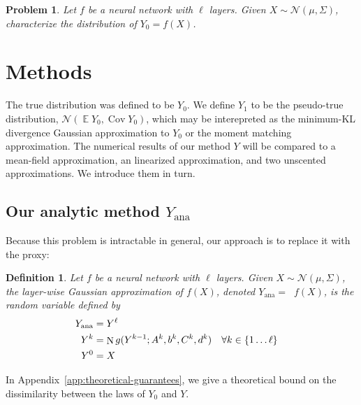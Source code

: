 \documentclass{article}
\newtheorem{definition}{Definition}
\newtheorem{problem}{Problem}
\DeclareMathOperator{\expect}{\mathbb{E}}
\DeclareMathOperator{\Cov}{\operatorname{Cov}}
\DeclareMathOperator{\normal}{\mathrm N}
\DeclareMathOperator{\Normal}{\mathrm N^*}
\begin{document}
\begin{problem}
    \label{prob:problem}
    Let \(f\) be a neural network with \(\ell\) layers.
    Given \(X \sim \mathcal N(\mu, \Sigma)\), characterize the distribution of \(Y_0 = f(X)\).
\end{problem}


\section{Methods}
The true distribution was defined to be \(Y_0\).
We define \(Y_1\) to be the pseudo-true distribution, \(\mathcal N(\expect Y_0, \Cov Y_0)\), which may be interepreted as the minimum-KL divergence Gaussian approximation to \(Y_0\) or the moment matching approximation.
The numerical results of our method \(Y\) will be compared to a mean-field approximation, an linearized approximation, and two unscented approximations.
We introduce them in turn.

\subsection{Our analytic method \(Y_\mathrm{ana}\)}
Because this problem is intractable in general, our approach is to replace it with the proxy:

\begin{definition}
    Let \(f\) be a neural network with \(\ell\) layers.
    Given \(X \sim \mathcal N(\mu, \Sigma)\), the layer-wise Gaussian approximation of \(f(X)\), denoted \(Y_\mathrm{ana} = \Normal f(X)\), is the random variable defined by
    \begin{align*}
        Y_\mathrm{ana} &=  Y^\ell\\
        Y^k &= \normal g(Y^{k-1}; A^k, b^k, C^k, d^k) & \forall k &\in \cbr{1 \ldots \ell} \\
        Y^0 &= X
    \end{align*}
\end{definition}

In Appendix~\ref{app:theoretical-guarantees}, we give a theoretical bound on the dissimilarity between the laws of \(Y_0\) and \(Y\).
\end{document}
